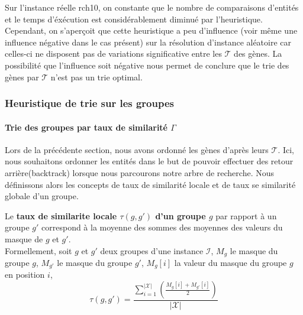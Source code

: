 %	
%	
%
%	
%	

Sur l'instance réelle rch10, on constante que le nombre de comparaisons d'entités  et le temps d'éxécution est considérablement diminué par l'heuristique. Cependant, on s'aperçoit que cette heuristique a peu d'influence (voir même une influence négative dans le cas présent) sur la résolution d'instance aléatoire car celles-ci ne disposent pas de variations significative entre les $\mathcal{T}$ des gènes. La possibilité que l'influence soit négative nous permet de conclure que le trie des gènes par $\mathcal{T}$ n'est pas un trie optimal. 


\subsubsection{Heuristique de trie sur les groupes}
\paragraph{Trie des groupes par taux de similarité $\Gamma$}
Lors de la précédente section, nous avons ordonné les gènes d'après leurs $\mathcal{T}$. Ici, nous souhaitons ordonner les entités dans le but de pouvoir effectuer des retour arrière(backtrack) lorsque nous parcourons notre arbre de recherche. Nous définissons alors les concepts de taux de similarité locale et de taux se similarité globale d'un groupe.

\begin{definition}
Le \textbf{taux de similarite locale $\tau(g,g')$ d'un groupe $g$} par rapport à un groupe $g'$ correspond à la moyenne des sommes des moyennes des valeurs du masque de $g$ et $g'$.\\
Formellement, soit $g$ et $g'$ deux groupes d'une instance $\mathcal{I}$, $M_g$ le masque du groupe $g$, $M_{g'}$ le masque du groupe $g'$, $M_g[i]$ la valeur du masque du groupe $g$ en position $i$,
$$ \tau(g,g')= \frac{\sum_{i=1}^{|\mathcal{X}|}(\frac{M_g[i]+M_{g'}[i]}{2})}{|\mathcal{X}|}$$
\end{definition}

